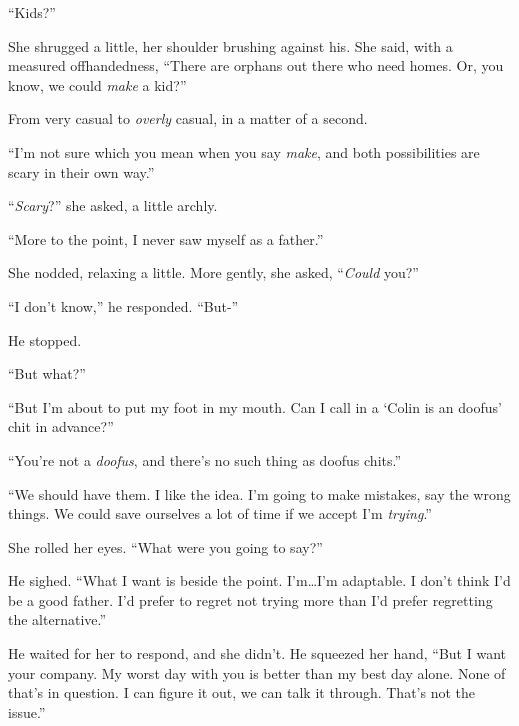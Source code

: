 ``Kids?''



She shrugged a little, her shoulder brushing against his.  She said, with a measured offhandedness, ``There are orphans out there who need homes.  Or, you know, we could \emph{make} a kid?''



From very casual to \emph{overly} casual, in a matter of a second.



``I'm not sure which you mean when you say \emph{make}, and both possibilities are scary in their own way.''



``\emph{Scary}?'' she asked, a little archly.



``More to the point, I never saw myself as a father.''



She nodded, relaxing a little.  More gently, she asked, ``\emph{Could} you?''



``I don't know,'' he responded.  ``But-''



He stopped.



``But what?''



``But I'm about to put my foot in my mouth.  Can I call in a `Colin is an doofus' chit in advance?''



``You're not a \emph{doofus}, and there's no such thing as doofus chits.''



``We should have them.  I like the idea.  I'm going to make mistakes, say the wrong things.  We could save ourselves a lot of time if we accept I'm \emph{trying}.''



She rolled her eyes.  ``What were you going to say?''



He sighed.  ``What I want is beside the point.  I'm\ldots I'm adaptable.  I don't think I'd be a good father.  I'd prefer to regret not trying more than I'd prefer regretting the alternative.''



He waited for her to respond, and she didn't.  He squeezed her hand, ``But I want your company.  My worst day with you is better than my best day alone.  None of that's in question.  I can figure it out, we can talk it through.  That's not the issue.''



